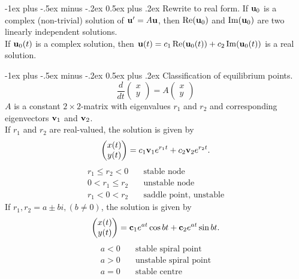 \documentclass[10pt,landscape,a4paper]{article}
\makeatletter
\renewcommand{\section}{\@startsection{section}{1}{0mm}%
	{-1ex plus -.5ex minus -.2ex}%
	{0.5ex plus .2ex}%
	{\normalfont\large\bfseries}}
\makeatother
\begin{document}
\begin{multicols}{3}
		\section{Rewrite to real form.}
		If $ \vb{u}_0 $ is a complex (non-trivial) solution of $ \vb{u}' = A\vb{u} $, then $ \Re(\vb{u}_0) $ and $ \Im(\vb{u}_0) $ are two linearly independent solutions.\\
		If $ \vb{u}_0(t) $ is a complex solution, then $ \vb{u}(t) = c_1 \Re(\vb{u}_0(t)) + c_2 \Im(\vb{u}_0(t)) $ is a real solution.
		
		\section{Classification of equilibrium points.}
		\[
			\frac{d}{dt} \begin{pmatrix}x\\y\end{pmatrix} = A \begin{pmatrix}x\\y\end{pmatrix}
		\]
		$ A $ is a constant $ 2 \times 2 $-matrix with eigenvalues $ r_1 $ and $ r_2 $ and corresponding eigenvectors $ \vb{v}_1 $ and $ \vb{v}_2 $.\\
		If $ r_1 $ and $ r_2 $ are real-valued, the solution is given by
		\[
			\begin{pmatrix}x(t)\\y(t)\end{pmatrix} = c_1 \vb{v}_1 e^{r_1 t} + c_2 \vb{v}_2 e^{r_2 t}.
		\]
		\begin{align*}
			r_1 \leq r_2 < 0 &\quad \text{stable node}\\
			0 < r_1 \leq r_2  &\quad \text{unstable node}\\
			r_1 < 0 < r_2 &\quad \text{saddle point, unstable}
		\end{align*}
		If $ r_1, r_2 = a \pm bi, (b \neq 0) $, the solution is given by
		\[
			\begin{pmatrix}x(t)\\y(t)\end{pmatrix} = \vb{c}_1 e^{at} \cos{bt} + \vb{c}_2 e^{at} \sin{bt}.
		\]
		\begin{align*}
			a < 0 &\quad \text{stable spiral point}\\
			a > 0  &\quad \text{unstable spiral point}\\
			a = 0 &\quad \text{stable centre}
		\end{align*}
		

\end{multicols}
\end{document}
